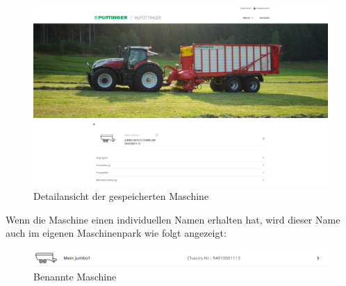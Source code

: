\begin{figure}[H]
	\centerline{
		\includegraphics[width=1\textwidth]{./grafiken/erm_detailansicht_saved_machine.png}
	}
	\vskip0pt
	\caption{Detailansicht der gespeicherten Maschine} \label{fig:maschinenpark}
\end{figure}

Wenn die Maschine einen individuellen Namen erhalten hat, wird dieser Name auch im eigenen Maschinenpark wie folgt angezeigt:
 
\begin{figure}[H]
	\centerline{
		\includegraphics[width=1\textwidth]{./grafiken/erm_maschinenpark_benannteMaschine.png}
	}
	\vskip0pt
	\caption{Benannte Maschine} \label{fig:benannteMaschine}
\end{figure}